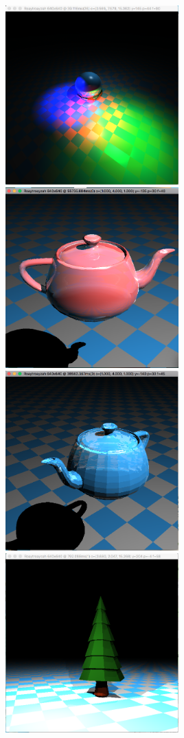 \includegraphics[width=0.5\textwidth]{img/niceSphere}
\includegraphics[width=0.5\textwidth]{img/t3}
\includegraphics[width=0.5\textwidth]{img/refractingTeapot}
\includegraphics[width=0.5\textwidth]{img/simpleTree}
